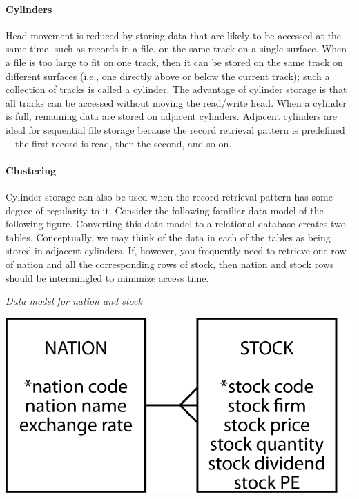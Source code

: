 \documentclass[
]{article}
\begin{document}
\hypertarget{cylinders}{%
\paragraph*{Cylinders}\label{cylinders}}

Head movement is reduced by storing data that are likely to be accessed
at the same time, such as records in a file, on the same track on a
single surface. When a file is too large to fit on one track, then it
can be stored on the same track on different surfaces (i.e., one
directly above or below the current track); such a collection of tracks
is called a cylinder. The advantage of cylinder storage is that all
tracks can be accessed without moving the read/write head. When a
cylinder is full, remaining data are stored on adjacent cylinders.
Adjacent cylinders are ideal for sequential file storage because the
record retrieval pattern is predefined---the first record is read, then
the second, and so on.

\hypertarget{clustering}{%
\paragraph*{Clustering}\label{clustering}}

Cylinder storage can also be used when the record retrieval pattern has
some degree of regularity to it. Consider the following familiar data
model of the following figure. Converting this data model to a
relational database creates two tables. Conceptually, we may think of
the data in each of the tables as being stored in adjacent cylinders.
If, however, you frequently need to retrieve one row of nation and all
the corresponding rows of stock, then nation and stock rows should be
intermingled to minimize access time.

\emph{Data model for nation and stock}

\includegraphics{Figures/Chapter 4/nation-stock.png}
\end{document}
